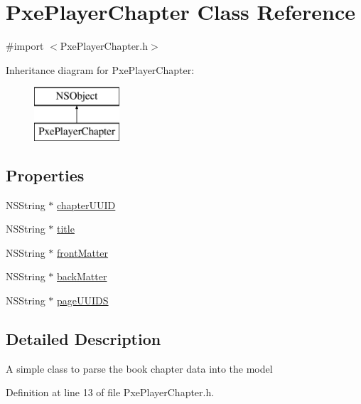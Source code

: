 \hypertarget{interface_pxe_player_chapter}{\section{Pxe\-Player\-Chapter Class Reference}
\label{interface_pxe_player_chapter}
}


{\ttfamily \#import $<$Pxe\-Player\-Chapter.\-h$>$}

Inheritance diagram for Pxe\-Player\-Chapter\-:\begin{figure}[H]
\begin{center}
\leavevmode
\includegraphics[height=2.000000cm]{interface_pxe_player_chapter}
\end{center}
\end{figure}
\subsection*{Properties}
\begin{DoxyCompactItemize}
\item 
N\-S\-String $\ast$ \hyperlink{interface_pxe_player_chapter_a188d94563ab2dba44cda27ee4a83adba}{chapter\-U\-U\-I\-D}
\item 
N\-S\-String $\ast$ \hyperlink{interface_pxe_player_chapter_a43ac97bc7f0f1875aca6f964b5e6c9a2}{title}
\item 
N\-S\-String $\ast$ \hyperlink{interface_pxe_player_chapter_ada01cfc06b789fdec327cd7e97ad7d60}{front\-Matter}
\item 
N\-S\-String $\ast$ \hyperlink{interface_pxe_player_chapter_aa544fdd4d275d2c0730fa62e732cee47}{back\-Matter}
\item 
N\-S\-String $\ast$ \hyperlink{interface_pxe_player_chapter_a2671676800d397a2a4311ddee7f69b88}{page\-U\-U\-I\-D\-S}
\end{DoxyCompactItemize}


\subsection{Detailed Description}
A simple class to parse the book chapter data into the model 

Definition at line 13 of file Pxe\-Player\-Chapter.\-h.



